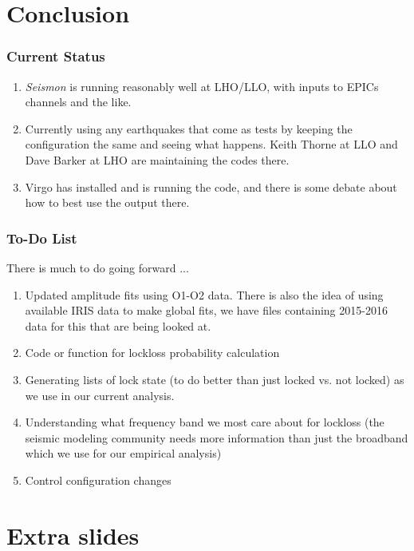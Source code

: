 \documentclass[ignorenonframetext,t,10pt]{beamer}
\begin{document}
\section{Conclusion}
\begin{frame}
  \frametitle{Current Status}

\begin{enumerate}
\item \emph{Seismon} is running reasonably well at LHO/LLO, with inputs to EPICs channels and the like. 
\item Currently using any earthquakes that come as tests by keeping the configuration the same and seeing what happens. Keith Thorne at LLO and Dave Barker at LHO are maintaining the codes there.
\item Virgo has installed and is running the code, and there is some debate about how to best use the output there.
\end{enumerate}

\end{frame}

\begin{frame}
  \frametitle{To-Do List}

There is much to do going forward ...
\begin{enumerate}
\item Updated amplitude fits using O1-O2 data. There is also the idea of using available IRIS data to make global fits, we have files containing 2015-2016 data for this that are being looked at.
\item Code or function for lockloss probability calculation
\item Generating lists of lock state (to do better than just locked vs. not locked) as we use in our current analysis.
\item Understanding what frequency band we most care about for lockloss (the seismic modeling community needs more information than just the broadband which we use for our empirical analysis)
\item Control configuration changes
\end{enumerate}

\end{frame}

\section{Extra slides}
\end{document}
